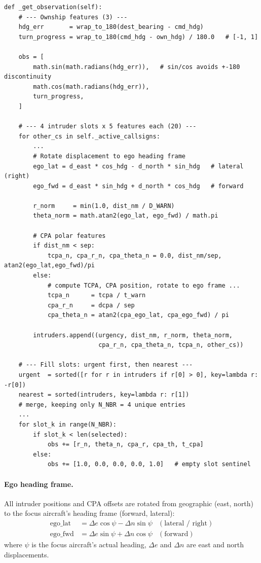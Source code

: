 \documentclass[11pt, a4paper]{article}
\begin{document}
\begin{lstlisting}[caption={Building the 23-element observation vector.}]
def _get_observation(self):
    # --- Ownship features (3) ---
    hdg_err       = wrap_to_180(dest_bearing - cmd_hdg)
    turn_progress = wrap_to_180(cmd_hdg - own_hdg) / 180.0   # [-1, 1]

    obs = [
        math.sin(math.radians(hdg_err)),   # sin/cos avoids +-180 discontinuity
        math.cos(math.radians(hdg_err)),
        turn_progress,
    ]

    # --- 4 intruder slots x 5 features each (20) ---
    for other_cs in self._active_callsigns:
        ...
        # Rotate displacement to ego heading frame
        ego_lat = d_east * cos_hdg - d_north * sin_hdg   # lateral (right)
        ego_fwd = d_east * sin_hdg + d_north * cos_hdg   # forward

        r_norm     = min(1.0, dist_nm / D_WARN)
        theta_norm = math.atan2(ego_lat, ego_fwd) / math.pi

        # CPA polar features
        if dist_nm < sep:
            tcpa_n, cpa_r_n, cpa_theta_n = 0.0, dist_nm/sep, atan2(ego_lat,ego_fwd)/pi
        else:
            # compute TCPA, CPA position, rotate to ego frame ...
            tcpa_n      = tcpa / t_warn
            cpa_r_n     = dcpa / sep
            cpa_theta_n = atan2(cpa_ego_lat, cpa_ego_fwd) / pi

        intruders.append((urgency, dist_nm, r_norm, theta_norm,
                          cpa_r_n, cpa_theta_n, tcpa_n, other_cs))

    # --- Fill slots: urgent first, then nearest ---
    urgent  = sorted([r for r in intruders if r[0] > 0], key=lambda r: -r[0])
    nearest = sorted(intruders, key=lambda r: r[1])
    # merge, keeping only N_NBR = 4 unique entries
    ...
    for slot_k in range(N_NBR):
        if slot_k < len(selected):
            obs += [r_n, theta_n, cpa_r, cpa_th, t_cpa]
        else:
            obs += [1.0, 0.0, 0.0, 0.0, 1.0]   # empty slot sentinel
\end{lstlisting}

\paragraph{Ego heading frame.}
All intruder positions and CPA offsets are rotated from geographic (east, north)
to the focus aircraft's heading frame (forward, lateral):
\begin{align}
  \text{ego\_lat} &= \Delta e \cos\psi - \Delta n \sin\psi & (\text{lateral / right}) \\
  \text{ego\_fwd} &= \Delta e \sin\psi + \Delta n \cos\psi & (\text{forward})
\end{align}
where $\psi$ is the focus aircraft's actual heading, $\Delta e$ and $\Delta n$ are
east and north displacements.
\end{document}
